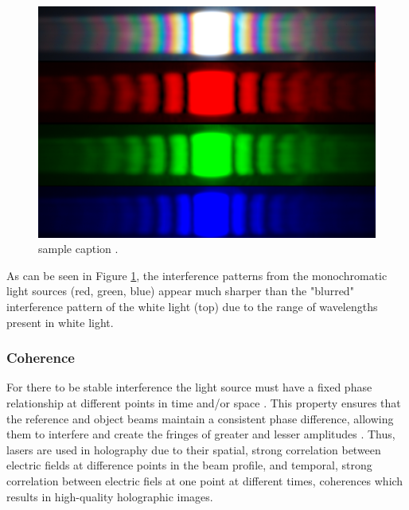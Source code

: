 \documentclass[12pt]{article}
\begin{document}
\begin{figure}[H]
    \centering
    \includegraphics[width=.5\textwidth]{interference patterns.jpg}
    \caption{\centering sample caption \protect\cite{holoimg2}.}
    \label{fig:4}
\end{figure}

As can be seen in Figure \ref{fig:4}, the interference patterns from the monochromatic light sources (red, green, blue) appear much sharper than the "blurred" interference pattern of the white light (top)
due to the range of wavelengths present in white light.

\subsubsection{Coherence}

For there to be stable interference the light source must have a fixed phase relationship at different points in time and/or space \cite{wolf2007introduction}.
This property ensures that the reference and object beams maintain a consistent phase difference, allowing them to interfere and create the fringes of greater and lesser amplitudes
\cite{Born_Wolf_Bhatia_Clemmow_Gabor_Stokes_Taylor_Wayman_Wilcock_1999}.
Thus, lasers are used in holography due to their spatial, strong correlation between electric fields at difference points in the beam profile, and temporal, strong correlation between electric fiels at one point at different times, coherences
\cite{Paschotta_2007_coherence} which results in high-quality holographic images.
\end{document}
